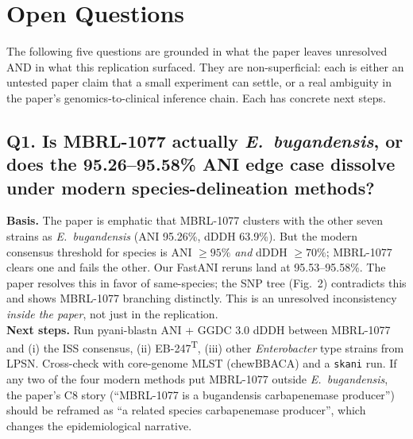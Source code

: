 \section{Open Questions}
\label{sec:openq}

The following five questions are grounded in what the paper leaves unresolved AND in what
this replication surfaced. They are non-superficial: each is either an untested paper claim
that a small experiment can settle, or a real ambiguity in the paper's genomics-to-clinical
inference chain. Each has concrete next steps.

\subsection*{Q1. Is MBRL-1077 actually \emph{E.\ bugandensis}, or does the 95.26--95.58\%
ANI edge case dissolve under modern species-delineation methods?}
\textbf{Basis.} The paper is emphatic that MBRL-1077 clusters with the other seven strains
as \emph{E.\ bugandensis} (ANI 95.26\%, dDDH 63.9\%). But the modern consensus threshold
for species is ANI $\geq 95\%$ \emph{and} dDDH $\geq 70\%$; MBRL-1077 clears one and fails
the other. Our FastANI reruns land at 95.53--95.58\%. The paper resolves this in favor of
same-species; the SNP tree (Fig.\ 2) contradicts this and shows MBRL-1077 branching
distinctly. This is an unresolved inconsistency \emph{inside the paper}, not just in the
replication. \\
\textbf{Next steps.} Run pyani-blastn ANI + GGDC 3.0 dDDH between MBRL-1077 and (i) the ISS
consensus, (ii) EB-247\textsuperscript{T}, (iii) other \emph{Enterobacter} type strains from
LPSN. Cross-check with core-genome MLST (chewBBACA) and a \texttt{skani} run. If any two of
the four modern methods put MBRL-1077 outside \emph{E.\ bugandensis}, the paper's C8 story
(``MBRL-1077 is a bugandensis carbapenemase producer'') should be reframed as ``a related
species carbapenemase producer'', which changes the epidemiological narrative.


